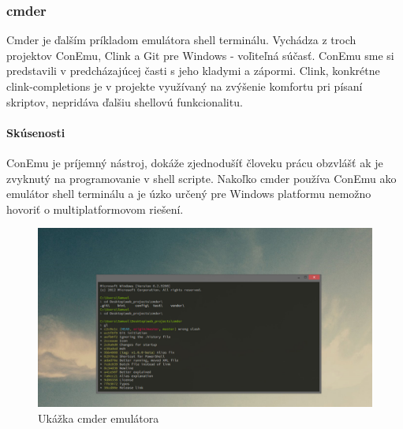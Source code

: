 \subsubsection{cmder}
\indent Cmder je ďalším príkladom emulátora shell terminálu. Vychádza z troch projektov ConEmu, Clink a Git pre Windows - voľiteľná súčasť. ConEmu sme si predstavili v predcházajúcej časti s jeho kladymi a zápormi. Clink, konkrétne clink-completions je v projekte využívaný na zvýšenie komfortu pri písaní skriptov, nepridáva ďalšiu shellovú funkcionalitu. \cite{cmder}
\paragraph{Skúsenosti}
\indent ConEmu je príjemný nástroj, dokáže zjednodušíť človeku prácu obzvlášť ak je zvyknutý na programovanie v shell scripte. Nakoľko cmder používa ConEmu ako emulátor shell terminálu a je úzko určený pre Windows platformu nemožno hovoriť o multiplatformovom riešení.
\begin{figure}[!htbp]
	\centering
	\includegraphics[scale=0.3]{img/cmder.jpg}
	\caption{Ukážka cmder emulátora}
	\label{fig:test}
\end{figure}
\newpage
